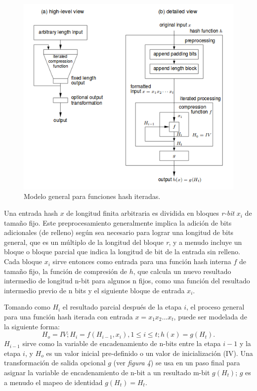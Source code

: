 \documentclass[a4paper, 12pt]{article} %
\begin{document}
\begin{figure}[h!]
	\centering
	\includegraphics[width=1\textwidth]{images/imagen_hashfunction.png}
	\caption{Modelo general para funciones hash iteradas.}
	\label{fig:Modelo_iteradas}
\end{figure}

Una entrada hash $x$ de longitud finita arbitraria es dividida en bloques \textit{r-bit} $x_i$ de tamaño fijo.
Este preprocesamiento generalmente implica la adición de bits adicionales (de relleno) según sea
necesario para lograr una longitud de bits general, que es un múltiplo de la longitud del bloque \textit{r}, y
a menudo incluye un bloque o bloque parcial que indica la longitud de bit de la entrada sin relleno.
Cada bloque $x_i$ sirve entonces como entrada para una función hash interna $f$ de tamaño fijo, la función
de compresión de $h$, que calcula un nuevo resultado intermedio de longitud n-bit para algunos n fijos,
como una función del resultado intermedio previo de n bits y el siguiente bloque de entrada $x_i$.

Tomando como $H_i$ el resultado parcial después de la etapa $i$, el proceso general para una función
hash iterada con entrada $x = x_1 x_2 ... x_t$, puede ser modelada de la siguiente forma:
\begin{equation*}
	H_o = IV;  H_i = f(H_{i-1}, x_i),  1 \leq i \leq t;  h(x) = g(H_t).
\end{equation*}
$H_{i-1}$ sirve como la variable de encadenamiento de n-bits entre la etapa $i-1$ y la etapa $i$, y
$H_o$ es un valor inicial pre-definido o un valor de inicialización (IV). Una transformación de salida opcional
$g$ (ver \textit{figura 4}) se usa en un paso final para asignar la variable de encadenamiento de n-bit a
un resultado m-bit $g(H_t)$; $g$ es a menudo el mapeo de identidad $g(H_t) = H_t$.
\end{document}
